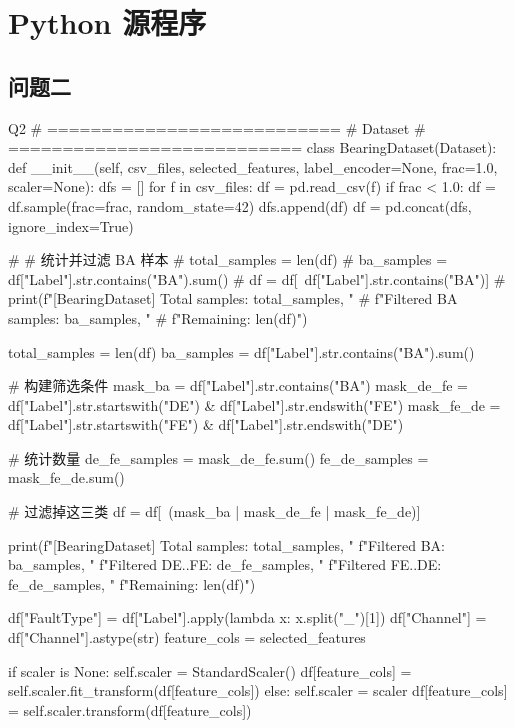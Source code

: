 \section{Python 源程序}
\renewcommand{\thesubsection}{B\thinskip.\thinskip\arabic{subsection}}
\subsection{问题二}
\vspace{-2ex}
\begin{Python}{Q2}
# ===========================
# Dataset
# ===========================
class BearingDataset(Dataset):
    def __init__(self, csv_files, selected_features, label_encoder=None, frac=1.0, scaler=None):
        dfs = []
        for f in csv_files:
            df = pd.read_csv(f)
            if frac < 1.0:
                df = df.sample(frac=frac, random_state=42)
            dfs.append(df)
        df = pd.concat(dfs, ignore_index=True)

        # # 统计并过滤 BA 样本
        # total_samples = len(df)
        # ba_samples = df["Label"].str.contains("BA").sum()
        # df = df[~df["Label"].str.contains("BA")]
        # print(f"[BearingDataset] Total samples: {total_samples}, "
        #       f"Filtered BA samples: {ba_samples}, "
        #       f"Remaining: {len(df)}")

        total_samples = len(df)
        ba_samples = df["Label"].str.contains("BA").sum()

        # 构建筛选条件
        mask_ba = df["Label"].str.contains("BA")
        mask_de_fe = df["Label"].str.startswith("DE") & df["Label"].str.endswith("FE")
        mask_fe_de = df["Label"].str.startswith("FE") & df["Label"].str.endswith("DE")

        # 统计数量
        de_fe_samples = mask_de_fe.sum()
        fe_de_samples = mask_fe_de.sum()

        # 过滤掉这三类
        df = df[~(mask_ba | mask_de_fe | mask_fe_de)]

        print(f"[BearingDataset] Total samples: {total_samples}, "
              f"Filtered BA: {ba_samples}, "
              f"Filtered DE..FE: {de_fe_samples}, "
              f"Filtered FE..DE: {fe_de_samples}, "
              f"Remaining: {len(df)}")


        df["FaultType"] = df["Label"].apply(lambda x: x.split("_")[1])
        df["Channel"] = df["Channel"].astype(str)
        feature_cols = selected_features

        if scaler is None:
            self.scaler = StandardScaler()
            df[feature_cols] = self.scaler.fit_transform(df[feature_cols])
        else:
            self.scaler = scaler
            df[feature_cols] = self.scaler.transform(df[feature_cols])


\end{Python}
